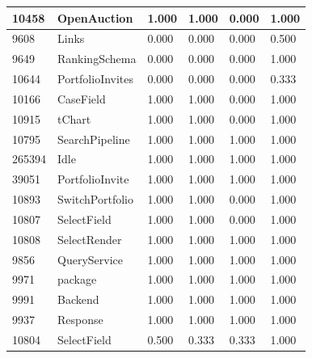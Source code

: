 \documentclass[a4paper]{article}
\newlength{\DUtablewidth} %
\begin{document}
\begin{longtable*}[c]{|p{0.160\DUtablewidth}|p{0.160\DUtablewidth}|p{0.160\DUtablewidth}|p{0.160\DUtablewidth}|p{0.160\DUtablewidth}|p{0.160\DUtablewidth}|}
10458
 & 
OpenAuction
 & 
1.000
 & 
1.000
 & 
0.000
 & 
1.000
 \\
\hline

9608
 & 
Links
 & 
0.000
 & 
0.000
 & 
0.000
 & 
0.500
 \\
\hline

9649
 & 
RankingSchema
 & 
0.000
 & 
0.000
 & 
0.000
 & 
1.000
 \\
\hline

10644
 & 
PortfolioInvites
 & 
0.000
 & 
0.000
 & 
0.000
 & 
0.333
 \\
\hline

10166
 & 
CaseField
 & 
1.000
 & 
1.000
 & 
0.000
 & 
1.000
 \\
\hline

10915
 & 
tChart
 & 
1.000
 & 
1.000
 & 
0.000
 & 
1.000
 \\
\hline

10795
 & 
SearchPipeline
 & 
1.000
 & 
1.000
 & 
1.000
 & 
1.000
 \\
\hline

265394
 & 
Idle
 & 
1.000
 & 
1.000
 & 
1.000
 & 
1.000
 \\
\hline

39051
 & 
PortfolioInvite
 & 
1.000
 & 
1.000
 & 
1.000
 & 
1.000
 \\
\hline

10893
 & 
SwitchPortfolio
 & 
1.000
 & 
1.000
 & 
0.000
 & 
1.000
 \\
\hline

10807
 & 
SelectField
 & 
1.000
 & 
1.000
 & 
0.000
 & 
1.000
 \\
\hline

10808
 & 
SelectRender
 & 
1.000
 & 
1.000
 & 
1.000
 & 
1.000
 \\
\hline

9856
 & 
QueryService
 & 
1.000
 & 
1.000
 & 
1.000
 & 
1.000
 \\
\hline

9971
 & 
package
 & 
1.000
 & 
1.000
 & 
1.000
 & 
1.000
 \\
\hline

9991
 & 
Backend
 & 
1.000
 & 
1.000
 & 
1.000
 & 
1.000
 \\
\hline

9937
 & 
Response
 & 
1.000
 & 
1.000
 & 
1.000
 & 
1.000
 \\
\hline

10804
 & 
SelectField
 & 
0.500
 & 
0.333
 & 
0.333
 & 
1.000
 \\
\hline


\end{longtable*}
\end{document}

